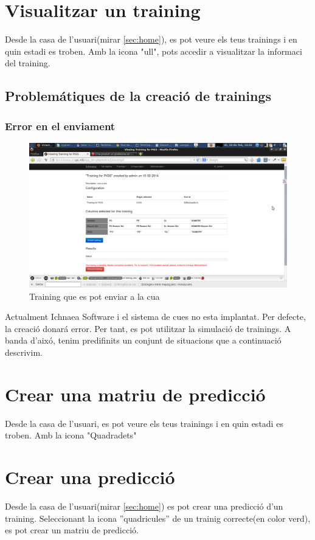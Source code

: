 \section{Visualitzar un training}
Desde la casa de l'usuari(mirar \ref{sec:home}), es pot veure els teus trainings i en quin estadi es troben. Amb la icona "ull", pots accedir a visualitzar la informaci del training.

\subsection{Problem\'{a}tiques de la creaci\'{o} de trainings}
\subsubsection*{Error en el enviament}
\begin{figure}[h!]
  \centering
  \includegraphics[scale=0.2]{img/userguide/view_training_pending.png}
  \caption{Training que es pot enviar a la cua}
  \label{fig:placement}
\end{figure}

Actualment Ichnaea Software i el sistema de cues no esta implantat. Per defecte, la creaci\'{o} donar\'{a} error. Per tant, es pot utilitzar la simulaci\'{o} de trainings.
A banda d'aix\'{o}, tenim predifinits un conjunt de situacions que a continuaci\'{o} descrivim.

\section{Crear una matriu de predicci\'{o}}
Desde la casa de l'usuari, es pot veure els teus trainings i en quin estadi es troben. Amb la icona "Quadradets"

\section{Crear una predicci\'{o}}
Desde la casa de l'usuari(mirar \ref{sec:home}) es pot crear una predicci\'{o} d'un training. Seleccionant la icona ''quadricules'' de un trainig correcte(en color verd), es pot crear un matriu de predicci\'{o}.

